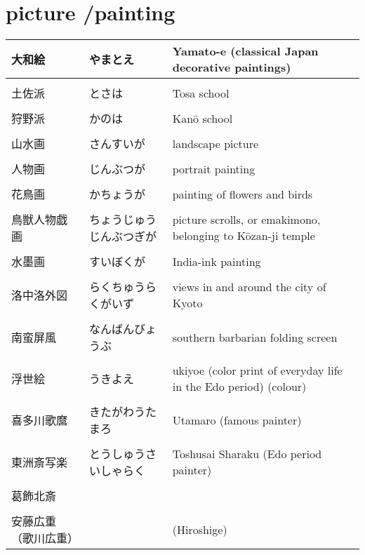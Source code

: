 \documentclass{article}
\newcommand\tabni[1][0.2cm]{\hspace*{#1}}
\begin{document}
\section{ \tabni picture /painting}
\begin{tabular}{ l | l | p{10.5cm} }
大和絵			&	やまとえ			& Yamato-e (classical Japan decorative paintings) \\ \hline \\[-1em]
土佐派			&	とさは				& Tosa school \\ \hline \\[-1em]
狩野派			&	かのは			& Kanō school \\ \hline \\[-1em]
山水画			&	さんすいが			& landscape picture \\ \hline \\[-1em]
人物画			&	じんぶつが			& portrait painting \\ \hline \\[-1em]
花鳥画			&	かちょうが			& painting of flowers and birds \\ \hline \\[-1em]
鳥獣人物戯画		&	ちょうじゅうじんぶつぎが	& picture scrolls, or emakimono, belonging to Kōzan-ji temple \\ \hline \\[-1em]
水墨画			&	すいぼくが			& India-ink painting \\ \hline \\[-1em]
洛中洛外図		&	らくちゅうらくがいず		& views in and around the city of Kyoto \\ \hline \\[-1em]
南蛮屏風			&	なんばんびょうぶ		& southern barbarian folding screen \\ \hline \\[-1em]
浮世絵			&	うきよえ			& ukiyoe (color print of everyday life in the Edo period) (colour) \\ \hline \\[-1em]
喜多川歌麿		&	きたがわうたまろ		& Utamaro (famous painter) \\ \hline \\[-1em]
東洲斎写楽		&	とうしゅうさいしゃらく	& Toshusai Sharaku (Edo period painter) \\ \hline \\[-1em]
葛飾北斎			&					& \\ \hline \\[-1em]
安藤広重（歌川広重）	&					& (Hiroshige) %
\end{tabular}
\end{document}
